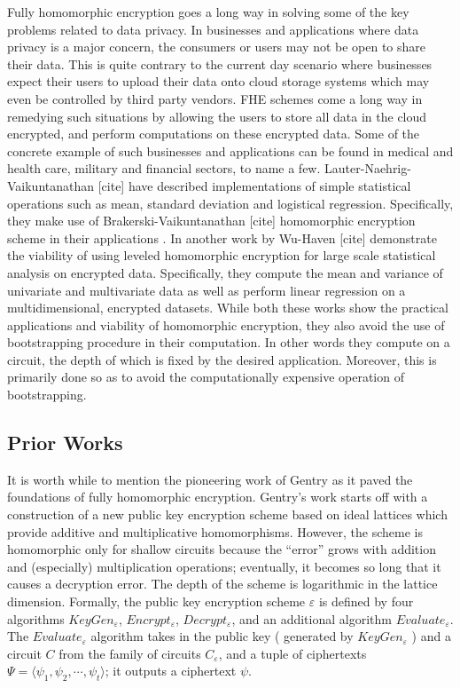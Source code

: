 \documentclass[10pt,journal,compsoc]{IEEEtran}
\theoremstyle{definition}
\begin{document}
Fully homomorphic encryption goes a long way in solving some of the key problems related to data privacy. In businesses and applications where data privacy is a major concern, the consumers or users may not be open to share their data. This is quite contrary to the current day scenario where businesses expect their users to upload their data onto cloud storage systems which may even be controlled by third party vendors. FHE schemes come a long way in remedying such situations by allowing the users to store all data in the cloud encrypted, and perform computations on these encrypted data. Some of the concrete example of such businesses and applications can be found in medical and health care, military and financial sectors, to name a few. Lauter-Naehrig-Vaikuntanathan [cite] have described implementations of simple statistical operations such as mean, standard deviation and logistical regression. Specifically, they make use of Brakerski-Vaikuntanathan [cite] homomorphic encryption scheme in their applications . In another work by Wu-Haven [cite] demonstrate the viability of using leveled homomorphic encryption for large scale statistical analysis on encrypted data. Specifically, they compute the mean and variance of univariate and multivariate data as well as perform linear regression on a multidimensional, encrypted datasets. While both these works show the practical applications and viability of homomorphic encryption, they also avoid the use of bootstrapping procedure in their computation. In other words they compute on a circuit, the depth of which is fixed by the desired application. Moreover, this is primarily done so as to avoid the computationally expensive operation of bootstrapping.


\subsection{Prior Works}

It is worth while to mention the pioneering work of Gentry as it paved the foundations of fully homomorphic encryption. Gentry's work starts off with a construction of a new public key encryption scheme based on ideal lattices which provide additive and multiplicative homomorphisms. However, the scheme is homomorphic only for shallow circuits because the ``error'' grows with addition and (especially) multiplication operations; eventually, it becomes so long that it causes a decryption error. The depth of the scheme is logarithmic in the lattice dimension. Formally, the public key encryption scheme $\varepsilon$ is defined by four algorithms $KeyGen_{\varepsilon}$, $Encrypt_\varepsilon$, $Decrypt_\varepsilon$, and an additional algorithm $Evaluate_\varepsilon$. The $Evaluate_\varepsilon$ algorithm takes in the public key ( generated by $KeyGen_{\varepsilon}$ ) and a circuit $C$ from the family of circuits $C_\varepsilon$, and a tuple of ciphertexts $\Psi = \langle  \psi_1,\psi_2, \cdots ,\psi_t \rangle$; it outputs a ciphertext $\psi$. 
\end{document}
